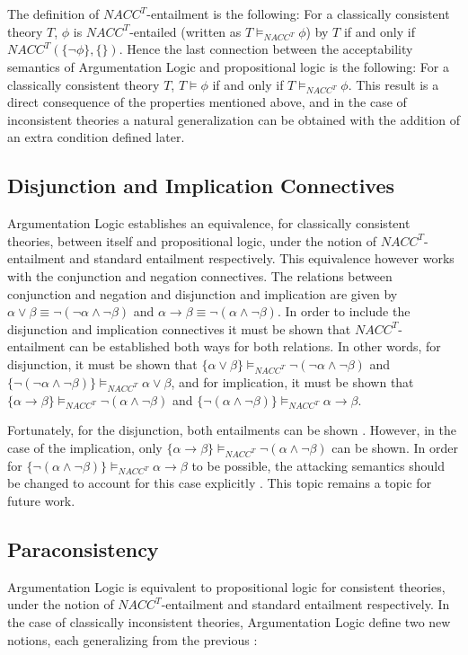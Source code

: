 \documentclass[11pt,twoside,a4paper]{report}
\begin{document}
The definition of $NACC^T$-entailment is the following: For a classically consistent theory $T$, $\phi$ is $NACC^T$-entailed (written as $T\models_{NACC^T}\phi$) by $T$ if and only if $NACC^T(\{\neg\phi\},\{\})$. Hence the last connection between the acceptability semantics of Argumentation Logic and propositional logic is the following: For a classically consistent theory $T$, $T\models\phi$ if and only if $T\models_{NACC^T}\phi$. 
This result is a direct consequence of the properties mentioned above, and in the case of inconsistent theories a natural generalization can be obtained with the addition of an extra condition defined later.

\subsection{Disjunction and Implication Connectives}
Argumentation Logic establishes an equivalence, for classically consistent theories, between itself and propositional logic, under the notion of $NACC^T$-entailment and standard entailment respectively. This equivalence however works with the conjunction and negation connectives. The relations between conjunction and negation and disjunction and implication are given by $\alpha\vee\beta \equiv \neg(\neg\alpha\wedge\neg\beta)$ and $\alpha\rightarrow\beta \equiv \neg(\alpha\wedge\neg\beta)$. In order to include the disjunction and implication connectives it must be shown that $NACC^T$-entailment can be established both ways for both relations. In other words, for disjunction, it must be shown that $\{\alpha\vee\beta\}\models_{NACC^T}\neg(\neg\alpha\wedge\neg\beta)$ and $\{\neg(\neg\alpha\wedge\neg\beta)\}\models_{NACC^T}\alpha\vee\beta$, and for implication, it must be shown that $\{\alpha\rightarrow\beta\}\models_{NACC^T}\neg(\alpha\wedge\neg\beta)$ and $\{\neg(\alpha\wedge\neg\beta)\}\models_{NACC^T}\alpha\rightarrow\beta$.

Fortunately, for the disjunction, both entailments can be shown \citep*[pp. 11-12]{alpaper}. However, in the case of the implication, only $\{\alpha\rightarrow\beta\}\models_{NACC^T}\neg(\alpha\wedge\neg\beta)$ can be shown. In order for $\{\neg(\alpha\wedge\neg\beta)\}\models_{NACC^T}\alpha\rightarrow\beta$ to be possible, the attacking semantics should be changed to account for this case explicitly \citep*[pp. 12-13]{alpaper}. This topic remains a topic for future work.

\subsection{Paraconsistency}
Argumentation Logic is equivalent to propositional logic for consistent theories, under the notion of $NACC^T$-entailment and standard entailment respectively. In the case of classically inconsistent theories, Argumentation Logic define two new notions, each generalizing from the previous \citep*[pp. 13-15]{alpaper}:
\end{document}
